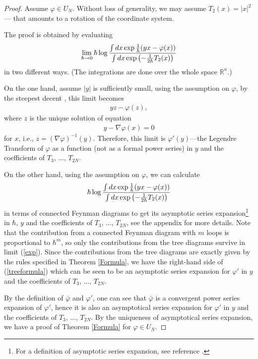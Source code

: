 \documentclass{article}
\newcommand{\bb}{\mathbb}
\newcommand{\Rn}{{\bb R}^n}
\newtheorem{main theorem}[defn]{Main Theorem}
\begin{document}
\begin{proof} Assume $\varphi\in U_N$. Without loss of generality, we may assume
$T_2(x)=|x|^2$ --- that amounts to a rotation of the coordinate
system.

The proof is obtained by evaluating
\begin{eqnarray}\label{exp}
\lim_{\hbar \to 0}\hbar \log {\int dx \exp{1\over
\hbar}{\left(yx-\varphi(x)\right)}\over \int dx
\exp{\left(-{1\over 2\hbar}T_2(x)\right)} }
\end{eqnarray}
in two different ways. (The integrations are done over the whole
space $\Rn$.)

On the one hand, assume $|y|$ is sufficiently small, using the
assumption on $\varphi$, by the steepest decent \cite{BH86}, this
limit becomes
\begin{eqnarray}
yz-\varphi(z),
\end{eqnarray}
where $z$ is the unique solution of equation
\begin{eqnarray}
y-\nabla\varphi(x)=0
\end{eqnarray}
for $x$, i.e., $z=(\nabla\varphi)^{-1}(y)$. Therefore, this limit
is $\varphi'(y)$---the Legendre Transform of $\varphi$ as a
function (not as a formal power series) in $y$ and the
coefficients of $T_3$, ..., $T_{2N}$.

On the other hand, using the assumption on $\varphi$, we can
calculate
\begin{eqnarray}
\hbar\log {\int dx \exp{1\over
\hbar}{\left(yx-\varphi(x)\right)}\over \int dx
\exp{\left(-{1\over 2\hbar}T_2(x)\right)} }
\end{eqnarray}
in terms of connected Feynman diagrams to get its asymptotic
series expansion\footnote{For a definition of asymptotic series
expansion, see reference \cite{BH86}.} in $\hbar$, $y$ and the
coefficients of $T_3$, ..., $T_{2N}$, see the appendix for more
details. Note that the contribution from a connected Feynman
diagram with $m$ loops is proportional to $\hbar^{m}$, so only the
contributions from the tree diagrams survive in limit (\ref{exp}).
Since the contributions from the tree diagrams are exactly given
by the rules specified in Theorem \ref{Formula}, we have the
right-hand side of (\ref{treeformula}) which can be seen to be an
asymptotic series expansion for $\varphi'$ in $y$ and the
coefficients of $T_3$, ..., $T_{2N}$.

By the definition of $\bar\varphi$ and $\varphi'$, one can see
that $\bar\varphi$ is a convergent power series expansion of
$\varphi'$, hence it is also an asymptotical series expansion for
$\varphi'$ in $y$ and the coefficients of $T_3$, ..., $T_{2N}$. By
the uniqueness of asymptotical series expansion, we have a proof
of Theorem \ref{Formula} for $\varphi\in U_N$.
\end{proof}
\end{document}
